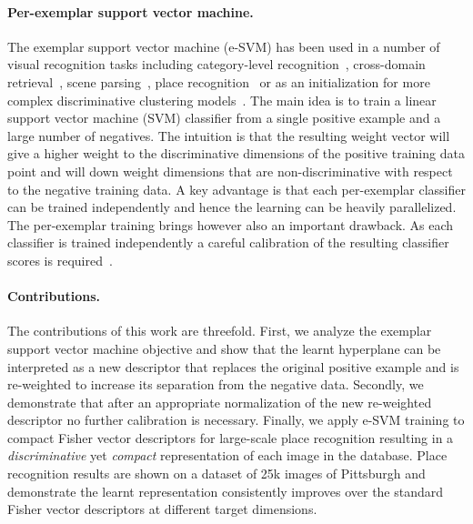 \documentclass[10pt,twocolumn,letterpaper]{article}
\begin{document}
\paragraph{Per-exemplar support vector machine.} %
    The exemplar support vector machine (e-SVM) has been used in a number of visual recognition tasks including category-level recognition~\cite{Malisiewicz11}, cross-domain retrieval~\cite{Shrivastava11}, scene parsing~\cite{Tighe13}, place recognition~\cite{Gronat13} or as an initialization  for more complex discriminative clustering models~\cite{Doersch12,Singh12}. The main idea is to train a linear support vector machine (SVM) classifier from a single positive example and a large number of negatives. The intuition is that the resulting weight vector will give a higher weight to the discriminative dimensions of the positive training data point and will down weight dimensions that are non-discriminative with respect to the negative training data. A key advantage is that each per-exemplar classifier can be trained independently and hence the learning can be heavily parallelized. The per-exemplar training brings however also an important drawback. As each classifier is trained independently a careful calibration of the resulting classifier scores is required~\cite{Gronat13,Malisiewicz11}. 

\paragraph{Contributions.} %
    The contributions of this work are threefold.
    First, we analyze the exemplar support vector machine objective and show that the learnt hyperplane can be interpreted as a new descriptor that replaces the original positive example and is re-weighted to increase its separation from the negative data. Secondly, we demonstrate that after an appropriate normalization of the new re-weighted descriptor no further calibration is necessary. Finally, we apply e-SVM training to compact Fisher vector descriptors for large-scale place recognition resulting in a {\em discriminative} yet {\em compact} representation of each image in the database. Place recognition results are shown on a dataset of 25k images of Pittsburgh and demonstrate the learnt representation consistently improves over the standard Fisher vector descriptors at different target dimensions.
\end{document}
